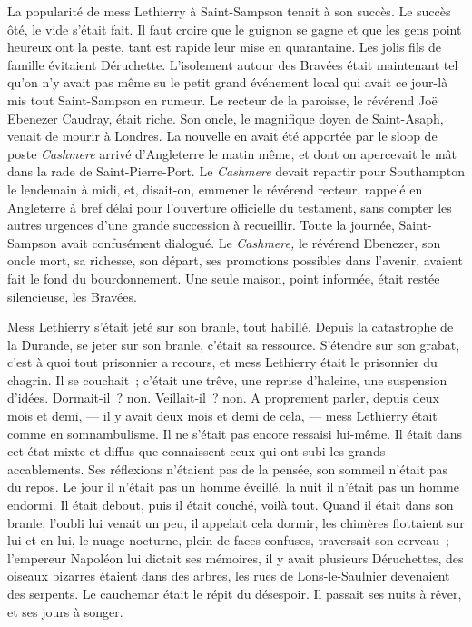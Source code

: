 \documentclass[french,twoside]{book} %
\begin{document}
La popularité de mess Lethierry à Saint-Sampson tenait à son succès. Le succès ôté, le vide s’était fait. Il faut croire que le guignon se gagne et que les gens point heureux ont la peste, tant est rapide leur mise en quarantaine. Les jolis fils de famille évitaient Déruchette. L’isolement autour des Bravées était maintenant tel qu’on n’y avait pas même su le petit grand événement local qui avait ce jour-là mis tout Saint-Sampson en rumeur. Le recteur de la paroisse, le révérend Joë Ebenezer Caudray, était riche. Son oncle, le magnifique doyen de Saint-Asaph, venait de mourir  à Londres. La nouvelle en avait été apportée par le sloop de poste \emph{Cashmere} arrivé d’Angleterre le matin même, et dont on apercevait le mât dans la rade de Saint-Pierre-Port. Le \emph{Cashmere} devait repartir pour Southampton le lendemain à midi, et, disait-on, emmener le révérend recteur, rappelé en Angleterre à bref délai pour l’ouverture officielle du testament, sans compter les autres urgences d’une grande succession à recueillir. Toute la journée, Saint-Sampson avait confusément dialogué. Le \emph{Cashmere,} le révérend Ebenezer, son oncle mort, sa richesse, son départ, ses promotions possibles dans l’avenir, avaient fait le fond du bourdonnement. Une seule maison, point informée, était restée silencieuse, les Bravées.\par
Mess Lethierry s’était jeté sur son branle, tout habillé. Depuis la catastrophe de la Durande, se jeter sur son branle, c’était sa ressource. S’étendre sur son grabat, c’est à quoi tout prisonnier a recours, et mess Lethierry était le prisonnier du chagrin. Il se couchait ; c’était une trêve, une reprise d’haleine, une suspension d’idées. Dormait-il ? non. Veillait-il ? non. A proprement parler, depuis deux mois et demi, — il y avait deux mois et demi de cela, — mess Lethierry était comme en somnambulisme. Il ne s’était pas encore ressaisi lui-même. Il était dans cet état mixte et diffus que connaissent ceux qui ont subi les grands accablements. Ses réflexions n’étaient pas de la pensée, son sommeil n’était pas du repos. Le jour il n’était pas un homme éveillé, la nuit il n’était pas un homme endormi. Il était debout, puis il était couché, voilà  tout. Quand il était dans son branle, l’oubli lui venait un peu, il appelait cela dormir, les chimères flottaient sur lui et en lui, le nuage nocturne, plein de faces confuses, traversait son cerveau ; l’empereur Napoléon lui dictait ses mémoires, il y avait plusieurs Déruchettes, des oiseaux bizarres étaient dans des arbres, les rues de Lons-le-Saulnier devenaient des serpents. Le cauchemar était le répit du désespoir. Il passait ses nuits à rêver, et ses jours à songer.\par
\end{document}
